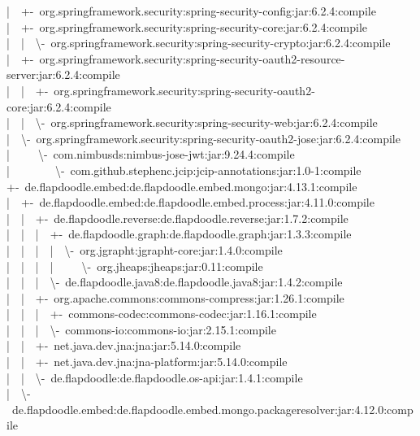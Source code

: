 |~~+-~org.springframework.security:spring-security-config:jar:6.2.4:compile\\
|~~+-~org.springframework.security:spring-security-core:jar:6.2.4:compile\\
|~~|~~\textbackslash-~org.springframework.security:spring-security-crypto:jar:6.2.4:compile\\
|~~+-~org.springframework.security:spring-security-oauth2-resource-server:jar:6.2.4:compile\\
|~~|~~+-~org.springframework.security:spring-security-oauth2-core:jar:6.2.4:compile\\
|~~|~~\textbackslash-~org.springframework.security:spring-security-web:jar:6.2.4:compile\\
|~~\textbackslash-~org.springframework.security:spring-security-oauth2-jose:jar:6.2.4:compile\\
|~~~~~\textbackslash-~com.nimbusds:nimbus-jose-jwt:jar:9.24.4:compile\\
|~~~~~~~~\textbackslash-~com.github.stephenc.jcip:jcip-annotations:jar:1.0-1:compile\\
+-~de.flapdoodle.embed:de.flapdoodle.embed.mongo:jar:4.13.1:compile\\
|~~+-~de.flapdoodle.embed:de.flapdoodle.embed.process:jar:4.11.0:compile\\
|~~|~~+-~de.flapdoodle.reverse:de.flapdoodle.reverse:jar:1.7.2:compile\\
|~~|~~|~~+-~de.flapdoodle.graph:de.flapdoodle.graph:jar:1.3.3:compile\\
|~~|~~|~~|~~\textbackslash-~org.jgrapht:jgrapht-core:jar:1.4.0:compile\\
|~~|~~|~~|~~~~~\textbackslash-~org.jheaps:jheaps:jar:0.11:compile\\
|~~|~~|~~\textbackslash-~de.flapdoodle.java8:de.flapdoodle.java8:jar:1.4.2:compile\\
|~~|~~+-~org.apache.commons:commons-compress:jar:1.26.1:compile\\
|~~|~~|~~+-~commons-codec:commons-codec:jar:1.16.1:compile\\
|~~|~~|~~\textbackslash-~commons-io:commons-io:jar:2.15.1:compile\\
|~~|~~+-~net.java.dev.jna:jna:jar:5.14.0:compile\\
|~~|~~+-~net.java.dev.jna:jna-platform:jar:5.14.0:compile\\
|~~|~~\textbackslash-~de.flapdoodle:de.flapdoodle.os-api:jar:1.4.1:compile\\
|~~\textbackslash-~de.flapdoodle.embed:de.flapdoodle.embed.mongo.packageresolver:jar:4.12.0:compile\\
